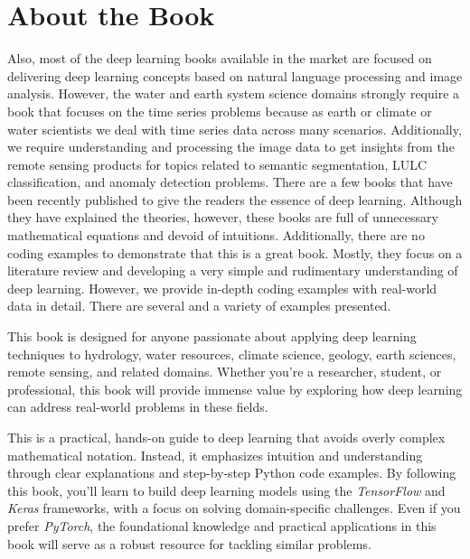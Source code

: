 \chapter*{About the Book}

Also, most of the deep learning books available in the market are focused on delivering deep learning concepts based on natural language processing and image analysis. However, the water and earth system science domains strongly require a book that focuses on the time series problems because as earth or climate or water scientists we deal with time series data across many scenarios. Additionally, we require understanding and processing the image data to get insights from the remote sensing products for topics related to semantic segmentation, LULC classification, and anomaly detection problems. 
There are a few books that have been recently published to give the readers the essence of deep learning. Although they have explained the theories, however, these books are full of unnecessary mathematical equations and devoid of intuitions. Additionally, there are no coding examples to demonstrate that this is a great book. Mostly, they focus on a literature review and developing a very simple and rudimentary understanding of deep learning. However, we provide in-depth coding examples with real-world data in detail. There are several and a variety of examples presented. 


This book is designed for anyone passionate about applying deep learning techniques to hydrology, water resources, climate science, geology, earth sciences, remote sensing, and related domains. Whether you’re a researcher, student, or professional, this book will provide immense value by exploring how deep learning can address real-world problems in these fields.

This is a practical, hands-on guide to deep learning that avoids overly complex mathematical notation. Instead, it emphasizes intuition and understanding through clear explanations and step-by-step Python code examples. By following this book, you’ll learn to build deep learning models using the \textit{TensorFlow} and \textit{Keras} frameworks, with a focus on solving domain-specific challenges. Even if you prefer \textit{PyTorch}, the foundational knowledge and practical applications in this book will serve as a robust resource for tackling similar problems.

